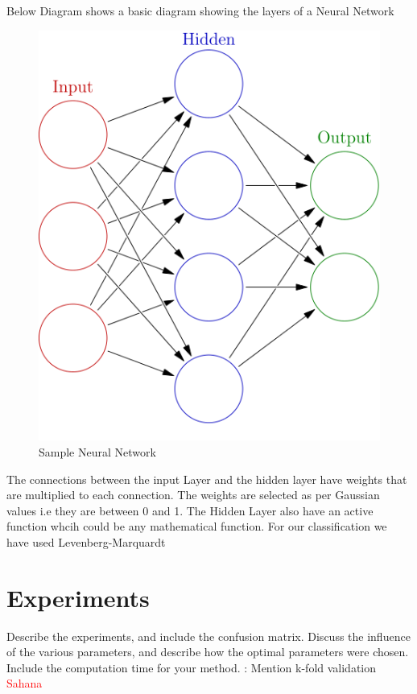 \documentclass[12pt]{article}
\begin{document}
Below Diagram shows a basic diagram showing the layers of a Neural Network
\begin{figure}[H]
\center
\includegraphics [scale=0.5]{ann.png}
\caption{Sample Neural Network}
\end{figure}
The connections between the input Layer and the hidden layer have weights that are multiplied to each connection. The weights are selected as per Gaussian values i.e they are between 0 and 1.
The Hidden Layer also have an active function whcih could be any mathematical function. For our classification we have used Levenberg-Marquardt
\section{Experiments}
Describe the experiments, and include the confusion matrix. Discuss
the influence of the various parameters, and describe how the optimal
parameters were chosen. Include the computation time for your method. :
Mention k-fold validation
\textcolor{red}{Sahana}
\end{document}
